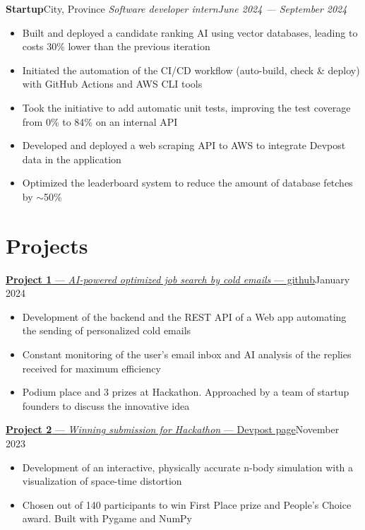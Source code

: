 \documentclass{article}
\newcommand{\newrole}[4]{
    {\normalfont\textbf{#1}\hfill#3}
    \newline
    \textit{#2}\hfill\textit{#4}
}
\newcommand{\shortlinkrole}[5]{
    {\href{#3}{\normalfont\textbf{#1} --- \textit{#2} --- #4\:\faExternalLink}\hfill#5\vspace*{-4pt}}
}
\newenvironment{bulletpoints}{\begin{itemize}\setlength\itemsep{-0.2em}}{\end{itemize}}
\begin{document}
\newrole{Startup}{Software developer intern}{City, Province}{June 2024 --- September 2024}
\begin{bulletpoints}
    \item Built and deployed a candidate ranking AI using vector databases, leading to costs 30\% lower than the previous iteration
    \item Initiated the automation of the CI/CD workflow (auto-build, check \& deploy) with GitHub Actions and AWS CLI tools
    \item Took the initiative to add automatic unit tests, improving the test coverage from 0\% to 84\% on an internal API
    \item Developed and deployed a web scraping API to AWS to integrate Devpost data in the application
    \item Optimized the leaderboard system to reduce the amount of database fetches by $\sim$50\%
\end{bulletpoints}


\section*{Projects}

\shortlinkrole{Project 1}{AI-powered optimized job search by cold emails}{https://github.com/github}{github}{January 2024}
\begin{bulletpoints}
    \item Development of the backend and the REST API of a Web app automating the sending of personalized cold emails
    \item Constant monitoring of the user's email inbox and AI analysis of the replies received for maximum efficiency
    \item Podium place and 3 prizes at Hackathon. Approached by a team of startup founders to discuss the innovative idea
\end{bulletpoints}

\shortlinkrole{Project 2}{Winning submission for Hackathon}{https://devpost.com}{Devpost page}{November 2023}
\begin{bulletpoints}
    \item Development of an interactive, physically accurate n-body simulation with a visualization of space-time distortion
    \item Chosen out of 140 participants to win First Place prize and People’s Choice award. Built with Pygame and NumPy
\end{bulletpoints}
\end{document}
